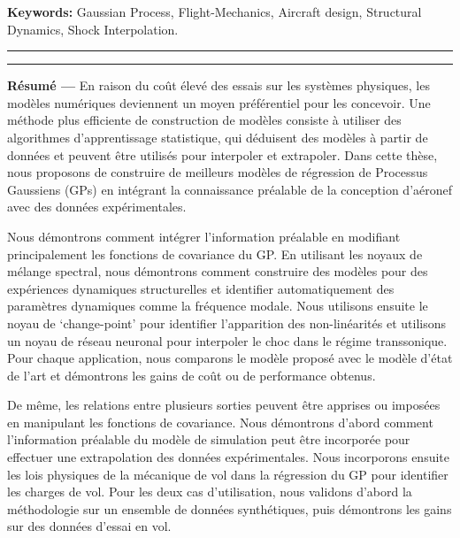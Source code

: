 {\large\textbf{Keywords:}}
    Gaussian Process, Flight-Mechanics, Aircraft design, Structural Dynamics, Shock Interpolation.
\\
\noindent\rule[2pt]{\textwidth}{0.5pt}

\pagebreak

\noindent\rule[2pt]{\textwidth}{0.5pt}

{\large\textbf{Résumé ---}}
En raison du coût élevé des essais sur les systèmes physiques, les modèles numériques deviennent un moyen préférentiel pour les concevoir. Une méthode plus efficiente de construction de modèles consiste à utiliser des algorithmes d'apprentissage statistique, qui déduisent des modèles à partir de données et peuvent être utilisés pour interpoler et extrapoler. Dans cette thèse, nous proposons de construire de meilleurs modèles de régression de Processus Gaussiens (GPs) en intégrant la connaissance préalable de la conception d'aéronef avec des données expérimentales.

Nous démontrons comment intégrer l'information préalable en modifiant principalement les fonctions de covariance du GP. En utilisant les noyaux de mélange spectral, nous démontrons comment construire des modèles pour des expériences dynamiques structurelles et identifier automatiquement des paramètres dynamiques comme la fréquence modale. Nous utilisons ensuite le noyau de `change-point' pour identifier l'apparition des non-linéarités et utilisons un noyau de réseau neuronal pour interpoler le choc dans le régime transsonique. Pour chaque application, nous comparons le modèle proposé avec le modèle d'état de l'art et démontrons les gains de coût ou de performance obtenus.


De même, les relations entre plusieurs sorties peuvent être apprises ou imposées en manipulant les fonctions de covariance. Nous démontrons d'abord comment l'information préalable du modèle de simulation peut être incorporée pour effectuer une extrapolation des données expérimentales. Nous incorporons ensuite les lois physiques de la mécanique de vol dans la régression du GP pour identifier les charges de vol. Pour les deux cas d'utilisation, nous validons d'abord la méthodologie sur un ensemble de données synthétiques, puis démontrons les gains sur des données d'essai en vol.

